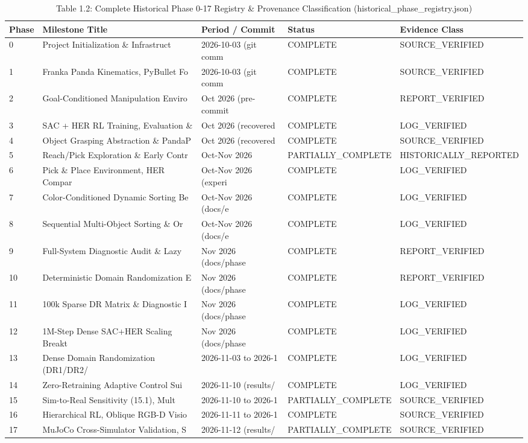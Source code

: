 \documentclass[11pt,a4paper,oneside]{book}
\begin{document}
\begin{longtable}{l l l l l}\caption{Table 1.2: Complete Historical Phase 0-17 Registry \& Provenance Classification (historical\_phase\_registry.json)}\\\toprule
Phase & Milestone Title & Period / Commit & Status & Evidence Class \\ \midrule \endhead
0 & Project Initialization \& Infrastruct & 2026-10-03 (git comm & COMPLETE & SOURCE\_VERIFIED \\
1 & Franka Panda Kinematics, PyBullet Fo & 2026-10-03 (git comm & COMPLETE & SOURCE\_VERIFIED \\
2 & Goal-Conditioned Manipulation Enviro & Oct 2026 (pre-commit & COMPLETE & REPORT\_VERIFIED \\
3 & SAC + HER RL Training, Evaluation \&  & Oct 2026 (recovered  & COMPLETE & LOG\_VERIFIED \\
4 & Object Grasping Abstraction \& PandaP & Oct 2026 (recovered  & COMPLETE & SOURCE\_VERIFIED \\
5 & Reach/Pick Exploration \& Early Contr & Oct-Nov 2026 & PARTIALLY\_COMPLETE & HISTORICALLY\_REPORTED \\
6 & Pick \& Place Environment, HER Compar & Oct-Nov 2026 (experi & COMPLETE & LOG\_VERIFIED \\
7 & Color-Conditioned Dynamic Sorting Be & Oct-Nov 2026 (docs/e & COMPLETE & LOG\_VERIFIED \\
8 & Sequential Multi-Object Sorting \& Or & Oct-Nov 2026 (docs/e & COMPLETE & LOG\_VERIFIED \\
9 & Full-System Diagnostic Audit \& Lazy  & Nov 2026 (docs/phase & COMPLETE & REPORT\_VERIFIED \\
10 & Deterministic Domain Randomization E & Nov 2026 (docs/phase & COMPLETE & REPORT\_VERIFIED \\
11 & 100k Sparse DR Matrix \& Diagnostic I & Nov 2026 (docs/phase & COMPLETE & LOG\_VERIFIED \\
12 & 1M-Step Dense SAC+HER Scaling Breakt & Nov 2026 (docs/phase & COMPLETE & LOG\_VERIFIED \\
13 & Dense Domain Randomization (DR1/DR2/ & 2026-11-03 to 2026-1 & COMPLETE & LOG\_VERIFIED \\
14 & Zero-Retraining Adaptive Control Sui & 2026-11-10 (results/ & COMPLETE & LOG\_VERIFIED \\
15 & Sim-to-Real Sensitivity (15.1), Mult & 2026-11-10 to 2026-1 & PARTIALLY\_COMPLETE & SOURCE\_VERIFIED \\
16 & Hierarchical RL, Oblique RGB-D Visio & 2026-11-11 to 2026-1 & COMPLETE & SOURCE\_VERIFIED \\
17 & MuJoCo Cross-Simulator Validation, S & 2026-11-12 (results/ & PARTIALLY\_COMPLETE & SOURCE\_VERIFIED \\
\bottomrule \end{longtable}
\end{document}
